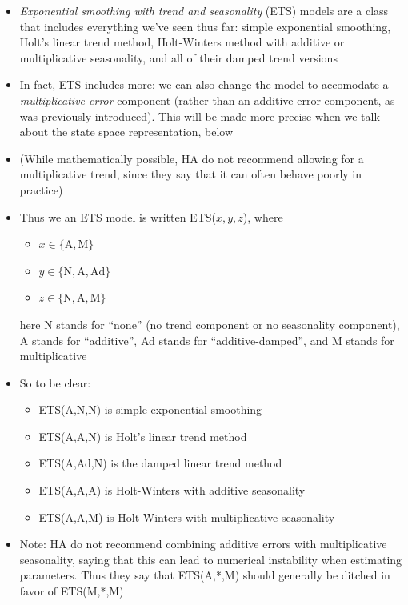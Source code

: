\documentclass{article}
\begin{document}
\begin{itemize}
\item \emph{Exponential smoothing with trend and seasonality} (ETS) models are a
  class that includes everything we've seen thus far: simple exponential
  smoothing, Holt's linear trend method, Holt-Winters method with additive or
  multiplicative seasonality, and all of their damped trend versions  

\item In fact, ETS includes more: we can also change the model to accomodate a  
  \emph{multiplicative error} component (rather than an additive error
  component, as was previously introduced). This will be made more precise when
  we talk about the state space representation, below 

\item (While mathematically possible, HA do not recommend allowing for a
  multiplicative trend, since they say that it can often behave poorly in
  practice) 

\item Thus we an ETS model is written ETS($x,y,z$), where 
  \begin{itemize}
  \item $x \in \{ \text{A}, \text{M} \}$
  \item $y \in \{ \text{N}, \text{A}, \text{Ad} \}$
  \item $z \in \{ \text{N}, \text{A}, \text{M} \}$
  \end{itemize}
  here N stands for ``none'' (no trend component or no seasonality component), A
  stands for ``additive'', Ad stands for ``additive-damped'', and M stands for
  multiplicative

\item So to be clear:
  \begin{itemize}
  \item ETS(A,N,N) is simple exponential smoothing
  \item ETS(A,A,N) is Holt's linear trend method
  \item ETS(A,Ad,N) is the damped linear trend method
  \item ETS(A,A,A) is Holt-Winters with additive seasonality
  \item ETS(A,A,M) is Holt-Winters with multiplicative seasonality
  \end{itemize}

\item Note: HA do not recommend combining additive errors with multiplicative
  seasonality, saying that this can lead to numerical instability when
  estimating parameters. Thus they say that ETS(A,*,M) should generally be
  ditched in favor of ETS(M,*,M)   
\end{itemize}
\end{document}

